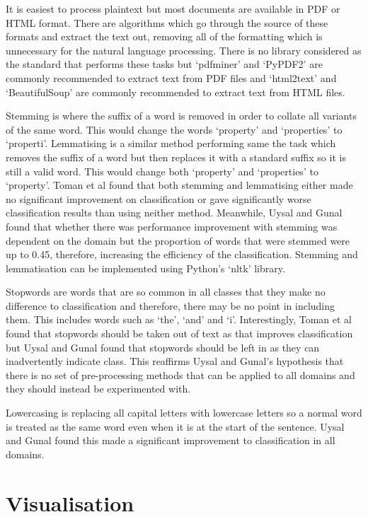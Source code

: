 			It is easiest to process plaintext but most documents are available in PDF or HTML format. There are algorithms which go through the source of these formats and extract the text out, removing all of the formatting which is unnecessary for the natural language processing. There is no library considered as the standard that performs these tasks but `pdfminer' and `PyPDF2' are commonly recommended to extract text from PDF files and `html2text' and `BeautifulSoup' are commonly recommended to extract text from HTML files.
			
			Stemming is where the suffix of a word is removed in order to collate all variants of the same word. This would change the words `property' and `properties' to `properti'. Lemmatising is a similar method performing same the task which removes the suffix of a word but then replaces it with a standard suffix so it is still a valid word\cite{influence_normalization_toman}. This would change both `property' and `properties' to `property'. Toman et al found that both stemming and lemmatising either made no significant improvement on classification or gave significantly worse classification results than using neither method\cite{influence_normalization_toman}. Meanwhile, Uysal and Gunal found that whether there was performance improvement with stemming was dependent on the domain but the proportion of words that were stemmed were up to 0.45\cite{impact_preprocessing_uysal}, therefore, increasing the efficiency of the classification. Stemming and lemmatisation can be implemented using Python's `nltk' library.
			
			Stopwords are words that are so common in all classes that they make no difference to classification and therefore, there may be no point in including them. This includes words such as `the', 	`and' and `i'. Interestingly, Toman et al found that stopwords should be taken out of text as that improves classification but Uysal and Gunal found that stopwords should be left in as they can inadvertently indicate class. This reaffirms Uysal and Gunal's hypothesis that there is no set of pre-processing methods that can be applied to all domains and they should instead be experimented with.
			
			Lowercasing is replacing all capital letters with lowercase letters so a normal word is treated as the same word even when it is at the start of the sentence. Uysal and Gunal found this made a significant improvement to classification in all domains.
	\section{Visualisation}
